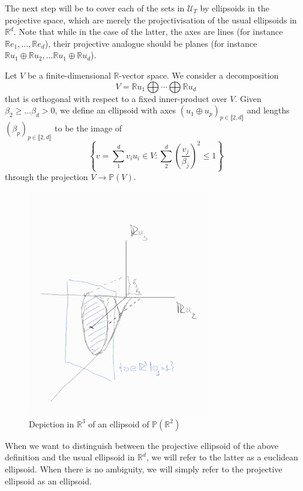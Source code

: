\documentclass{report}
\begin{document}
The next step will be to cover each of the sets in $\mathcal U_T$ by ellipsoids in the projective space, which are merely the projectivisation of the usual ellipsoids in $\mathbb R^d$.
Note that while in the case of the latter, the axes are lines (for instance $\mathbb Re_1, \ldots, \mathbb Re_d$), their projective analogue should be planes (for instance $\mathbb R u_1 \oplus \mathbb R u_2, \ldots \mathbb R u_1 \oplus \mathbb R u_d$).
\begin{definition}
    Let $V$ be a finite-dimensional $\mathbb R$-vector space.
    We consider a decomposition
    \[
        V = \mathbb R u_1 \bigoplus \cdots \bigoplus \mathbb R u_d
    \] 
    that is orthogonal with respect to a fixed inner-product over $V$.
    Given $\beta_2 \geq \ldots \beta_d > 0$, we define an ellipsoid with axes $\left(u_1 \oplus u_p\right)_{p \in \llbracket 2, d \rrbracket}$ and lengths $(\beta_p)_{p \in \llbracket 2, d \rrbracket}$ to be the image of
    \[
        \left\{
            v = \sum_1^d v_i u_i\in V : \sum_2^d \left( \frac{v_j}{\beta_j} \right)^2 \leq 1
        \right\}
    \]
    through the projection $ V \to \mathbb P (V)$.
\end{definition}
\begin{figure}[h]
    \centering
    \includegraphics[width=0.7\textwidth]{ellipsoid.jpg}
    \caption{Depiction in $\mathbb R^3$ of an ellipsoid of $\mathbb P(\mathbb R^2)$}
    \label{fig:ellipsoid}
\end{figure}
When we want to distinguish between the projective ellipsoid of the above definition and the usual ellipsoid in $\mathbb R^d$, we will refer to the latter as a euclidean ellipsoid.
When there is no ambiguity, we will simply refer to the projective ellipsoid as an ellipsoid.
\end{document}
